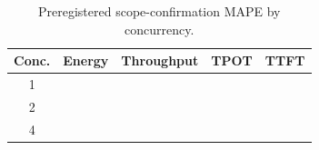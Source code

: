 \begin{table}[t]
\centering
\caption{Preregistered scope-confirmation MAPE by concurrency.}
\label{tab:scope-results}
\small
\setlength{\tabcolsep}{4.2pt}
\begin{tabular}{crrrr}
\toprule
Conc. & Energy & Throughput & TPOT & TTFT \\
\midrule
1 & \KOneEnergyMAPE{} & \KOneThroughputMAPE{} &
\KOneTPOTMAPE{} & \KOneTTFTMAPE{} \\
2 & \KTwoEnergyMAPE{} & \KTwoThroughputMAPE{} &
\KTwoTPOTMAPE{} & \KTwoTTFTMAPE{} \\
4 & \KFourEnergyMAPE{} & \KFourThroughputMAPE{} &
\KFourTPOTMAPE{} & \KFourTTFTMAPE{} \\
\bottomrule
\end{tabular}
\end{table}

